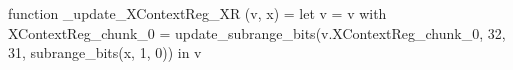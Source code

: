 function _update_XContextReg_XR (v, x) = let v = { v with XContextReg_chunk_0 = update_subrange_bits(v.XContextReg_chunk_0, 32, 31, subrange_bits(x, 1, 0)) } in
  v
